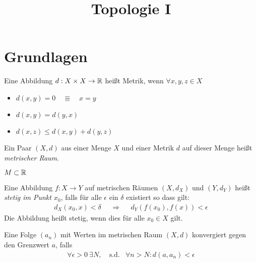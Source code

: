 \documentclass{skript}
\begin{document}
\title{Topologie I}
\author{}

\maketitle

\tableofcontents

\section{Grundlagen}
\begin{dfn}
    Eine Abbildung $d: X \times X \to \mathbb{R}$ heißt Metrik, wenn
    $\forall x,y,z \in X$
    \begin{itemize}
    \item $d(x, y) = 0 \quad \Equiv \quad x = y$
    \item $d(x, y) = d(y, x)$
    \item $d(x, z) \leq d(x, y) + d(y, z)$
    \end{itemize}
    Ein Paar $(X, d)$ aus einer Menge $X$ und einer Metrik $d$ auf dieser
    Menge heißt \emph{metrischer Raum}.    
\end{dfn}

\begin{bsp}
\end{bsp}

\begin{bsp}
\end{bsp}

\begin{bsp}[Unterraummetrik]
\end{bsp}

\begin{bsp}
    $M \subset \mathbb{R}$
\end{bsp}

\begin{dfn}[Stetigkeit]
    Eine Abbildung $f: X \to Y$ auf metrischen Räumen $(X,d_X)$ und $(Y, d_Y)$
    heißt \emph{stetig im Punkt $x_0$}, falls für alle $\epsilon$ ein $\delta$
    existiert so dass gilt:
    \begin{align*}
        d_X(x_0, x) < \delta& &\Rightarrow& &d_Y(f(x_0), f(x)) < \epsilon
    \end{align*}
    Die Abbildung heißt stetig, wenn dies für alle $x_0\in X$ gilt.
\end{dfn}

\begin{dfn}[Folgenkonvergenz]
    Eine Folge $(a_n)$ mit Werten im metrischen Raum $(X, d)$ konvergiert gegen den
    Grenzwert $a$, falls
    \begin{align*}
        \forall \epsilon > 0\ \exists N,\ &\mathrm{s.d.}& \forall n > N: d(a, a_n)
        < \epsilon
    \end{align*}
\end{dfn}
\end{document}
